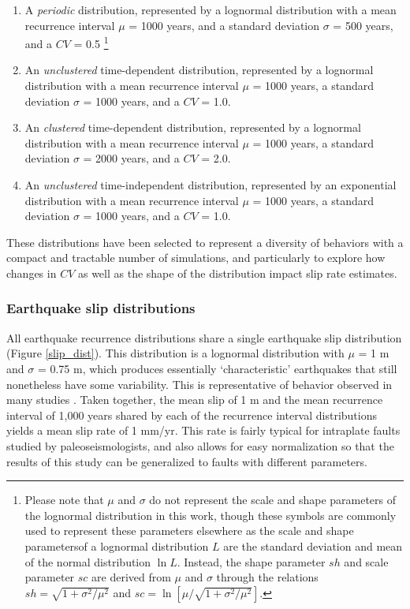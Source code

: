 \documentclass[se]{copernicus}
\begin{document}
\begin{enumerate}
\def\labelenumi{\arabic{enumi}.}
\item
  A \emph{periodic} distribution, represented by a lognormal
  distribution with a mean recurrence interval \(\mu\) = 1000 years, and
  a standard deviation \(\sigma\) = 500 years, and a \(CV\) =
  0.5 \footnote{Please note that $\mu$ and $\sigma$ do not represent the scale
  and shape parameters of the lognormal distribution in this work, though these
  symbols are commonly used to represent these parameters elsewhere as the
  scale and shape parametersof a lognormal distribution $L$ are the standard
  deviation and mean of the normal distribution $\ln L$. Instead, the shape
  parameter $sh$
  and scale parameter $sc$ are derived from $\mu$ and $\sigma$ through the
  relations $sh = \sqrt{1 + \sigma^2 / \mu^2}$ and 
  $sc = \ln [ \mu / \sqrt{1 + \sigma^2 / \mu^2}]$.}
\item
  An \emph{unclustered} time-dependent distribution, represented by a
  lognormal distribution with a mean recurrence interval \(\mu\) = 1000
  years, a standard deviation \(\sigma\) = 1000 years, and a \(CV\) =
  1.0.
\item
  An \emph{clustered} time-dependent distribution, represented by a
  lognormal distribution with a mean recurrence interval \(\mu\) = 1000
  years, a standard deviation \(\sigma\) = 2000 years, and a \(CV\) =
  2.0.
\item
  An \emph{unclustered} time-independent distribution, represented by an
  exponential distribution with a mean recurrence interval \(\mu\) =
  1000 years, a standard deviation \(\sigma\) = 1000 years, and a
  \(CV\) = 1.0.
\end{enumerate}

These distributions have been selected to represent a diversity of
behaviors with a compact and tractable number of simulations, and
particularly to explore how changes in \(CV\) as well as the shape of
the distribution impact slip rate estimates.

\subsubsection{Earthquake slip
distributions}\label{earthquake-slip-distributions}

All earthquake recurrence distributions share a single earthquake slip
distribution (Figure \ref{slip_dist}). This distribution is a lognormal
distribution with \(\mu\) = 1 m and \(\sigma\) = 0.75 m, which produces
essentially `characteristic' earthquakes that still nonetheless have
some variability. This is representative of behavior observed in many
studies \citep[e.g.,][]{zielke_slip_2010, klinger_characteristic_2011,
zielke_earthquake_2018}. Taken together, the mean slip of 1 m and the
mean recurrence interval of 1,000 years shared by each of the recurrence
interval distributions yields a mean slip rate of 1 mm/yr. This rate is
fairly typical for intraplate faults studied by paleoseismologists, and
also allows for easy normalization so that the results of this study can
be generalized to faults with different parameters.
\end{document}

